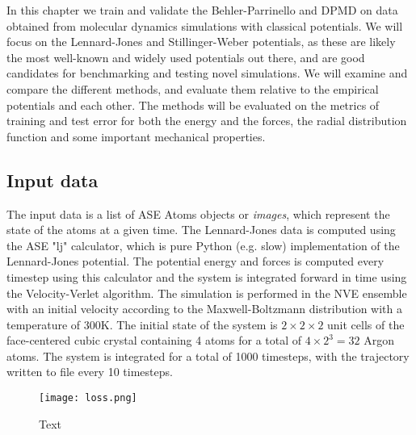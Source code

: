 In this chapter we train and validate the Behler-Parrinello
and DPMD on data obtained from molecular dynamics simulations
with classical potentials. We will focus on the Lennard-Jones
and Stillinger-Weber potentials, as these are likely the most
well-known and widely used potentials out there,
and are good candidates for benchmarking and testing
novel simulations. We will examine and compare the different
methods, and evaluate them relative to the empirical potentials
and each other. The methods will be evaluated on the metrics
of training and test error for both the energy and the forces,
the radial distribution function and some important mechanical properties.

\subsection{Input data}
The input data is a list of ASE Atoms objects or \textit{images},
which represent the state of the atoms at a given time.
The Lennard-Jones data is computed using the ASE "lj" calculator,
which is pure Python (e.g. slow) implementation of the Lennard-Jones potential.
The potential energy and forces is computed every timestep using this
calculator and the system is integrated forward in time using
the Velocity-Verlet algorithm. The simulation is performed in the NVE
ensemble with an initial velocity according to the Maxwell-Boltzmann
distribution with a temperature of 300K.
The initial state of the system is $2\times 2\times 2$
unit cells of the face-centered cubic crystal containing
4 atoms for a total of $4\times 2^3 = 32$ Argon atoms.
The system is integrated for a total of 1000 timesteps,
with the trajectory written to file every 10 timesteps.

\begin{figure}
    \centering
    \texttt{[image: loss.png]}
    \label{fig:}
    \caption{Text}
\end{figure}
